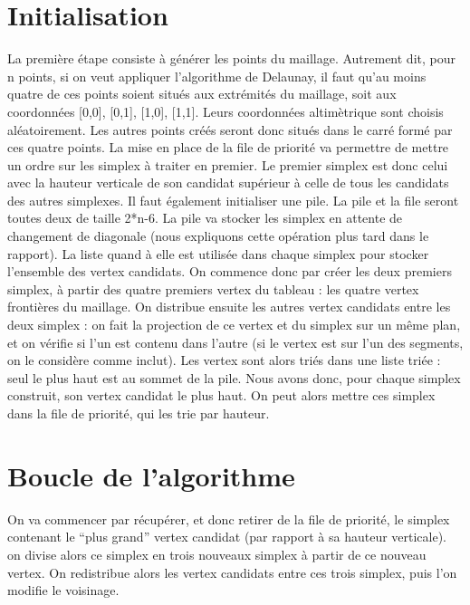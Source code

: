 \documentclass[10pt,a4paper]{report}
\begin{document}
	\section{Initialisation}
\hspace*{10mm}La première étape consiste à générer les points du maillage. Autrement dit, pour n points, si on veut appliquer l'algorithme de Delaunay, il faut qu'au moins quatre de ces points soient situés aux extrémités du maillage, soit aux coordonnées [0,0], [0,1], [1,0], [1,1]. Leurs coordonnées altimètrique sont choisis aléatoirement. Les autres points créés seront donc situés dans le carré formé par ces quatre points. 
La mise en place de la file de priorité va permettre de mettre un ordre sur les simplex à traiter en premier. Le premier simplex est donc celui avec la hauteur verticale de son candidat supérieur à celle de tous les candidats des autres simplexes. Il faut également initialiser une pile. La pile et la file seront toutes deux de taille 2*n-6. La pile va stocker les simplex en attente de changement de diagonale (nous expliquons cette opération plus tard dans le rapport). La liste quand à elle est utilisée dans chaque simplex pour stocker l'ensemble des vertex candidats.
\newline \newline
\hspace*{10mm}On commence donc par créer les deux premiers simplex, à partir des quatre premiers vertex du tableau : les quatre vertex frontières du maillage. On distribue ensuite les autres vertex candidats entre les deux simplex : on fait la projection de ce vertex et du simplex sur un même plan, et on vérifie si l'un est contenu dans l'autre (si le vertex est sur l'un des segments, on le considère comme inclut). \newline
Les vertex sont alors triés dans une liste triée : seul le plus haut est au sommet de la pile. Nous avons donc, pour chaque simplex construit, son vertex candidat le plus haut. On peut alors mettre ces simplex dans la file de priorité, qui les trie par hauteur.

	\section{Boucle de l’algorithme}
\hspace*{10mm}On va commencer par récupérer, et donc retirer de la file de priorité, le simplex contenant le “plus grand” vertex candidat (par rapport à sa hauteur verticale). on divise alors ce simplex en trois nouveaux simplex à partir de ce nouveau vertex. 
On redistribue alors les vertex candidats entre ces trois simplex, puis l'on modifie le voisinage.
	
\end{document}
